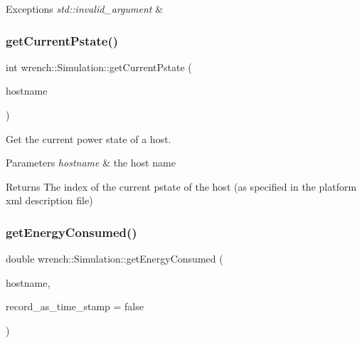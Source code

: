 \begin{DoxyExceptions}{Exceptions}
{\em std\+::invalid\+\_\+argument} & \\
\hline
\end{DoxyExceptions}
\mbox{\label{classwrench_1_1_simulation_a3d204b229feec1eee4f1e82d92490d81}} 
\subsubsection{\texorpdfstring{get\+Current\+Pstate()}{getCurrentPstate()}}
{\footnotesize\ttfamily int wrench\+::\+Simulation\+::get\+Current\+Pstate (\begin{DoxyParamCaption}\item[{const std\+::string \&}]{hostname }\end{DoxyParamCaption})\hspace{0.3cm}{\ttfamily [static]}}



Get the current power state of a host. 


\begin{DoxyParams}{Parameters}
{\em hostname} & the host name \\
\hline
\end{DoxyParams}
\begin{DoxyReturn}{Returns}
The index of the current pstate of the host (as specified in the platform xml description file) 
\end{DoxyReturn}
\mbox{\label{classwrench_1_1_simulation_ad5096f3b1d622eab4494eca4ae828d73}} 
\subsubsection{\texorpdfstring{get\+Energy\+Consumed()}{getEnergyConsumed()}\hspace{0.1cm}{\footnotesize\ttfamily [1/2]}}
{\footnotesize\ttfamily double wrench\+::\+Simulation\+::get\+Energy\+Consumed (\begin{DoxyParamCaption}\item[{const std\+::string \&}]{hostname,  }\item[{bool}]{record\+\_\+as\+\_\+time\+\_\+stamp = {\ttfamily false} }\end{DoxyParamCaption})}



